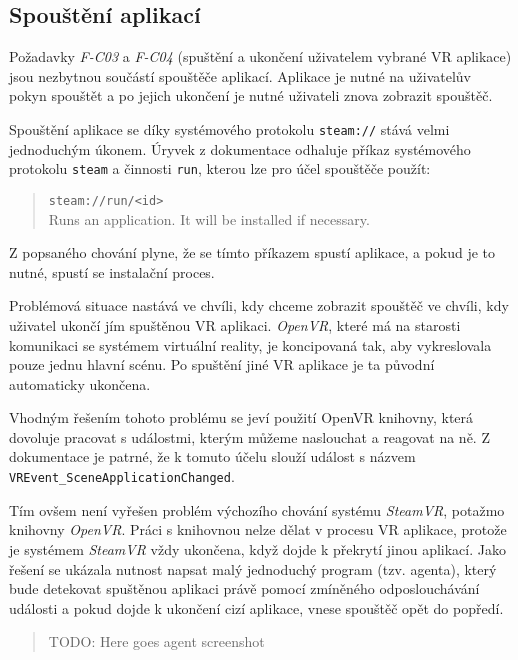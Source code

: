 \subsection{Spouštění
aplikací}\label{spouux161tux11bnuxed-aplikacuxed}

Požadavky \emph{F-C03} a \emph{F-C04} (spuštění a ukončení uživatelem
vybrané VR aplikace) jsou nezbytnou součástí spouštěče
aplikací. Aplikace je nutné na uživatelův pokyn spouštět a po jejich ukončení 
je nutné uživateli znova zobrazit spouštěč.

Spouštění aplikace se díky systémového protokolu \texttt{steam://} stává
velmi jednoduchým úkonem. Úryvek z dokumentace \autocite{protocoldocs} odhaluje příkaz
systémového protokolu \texttt{steam} a činnosti \texttt{run}, kterou lze
pro účel spouštěče použít:

\begin{quote}
\texttt{steam://run/\textless{}id\textgreater{}}\\
Runs an application. It will be installed if necessary.
\end{quote}

Z popsaného chování plyne, že se tímto příkazem spustí aplikace, a pokud je
to nutné, spustí se instalační proces. 

Problémová situace nastává ve
chvíli, kdy chceme zobrazit spouštěč ve chvíli, kdy uživatel
ukončí jím spuštěnou VR aplikaci. \emph{OpenVR}, které má na starosti
komunikaci se systémem virtuální reality, je koncipovaná tak, 
aby vykreslovala pouze jednu hlavní scénu. Po spuštění jiné VR aplikace 
je ta původní automaticky ukončena. \autocite{steamvrshuts}

Vhodným řešením tohoto problému se jeví použití OpenVR knihovny, která
dovoluje pracovat s událostmi, kterým můžeme naslouchat a reagovat na
ně. Z dokumentace \autocite{openvrdocs} je patrné, že k tomuto účelu slouží událost s názvem
\texttt{VREvent\_SceneApplicationChanged}. 

Tím ovšem není vyřešen
problém výchozího chování systému \emph{SteamVR}, potažmo knihovny
\emph{OpenVR}. Práci s knihovnou nelze dělat v procesu VR aplikace,
protože je systémem \emph{SteamVR} vždy ukončena, když dojde k 
překrytí jinou aplikací. Jako řešení se ukázala nutnost napsat malý 
jednoduchý program (tzv. agenta), který bude detekovat spuštěnou aplikaci právě
pomocí zmíněného odposlouchávání události a pokud dojde k ukončení cizí 
aplikace, vnese spouštěč opět do popředí.

\begin{quote}
TODO: Here goes agent screenshot
\end{quote}

